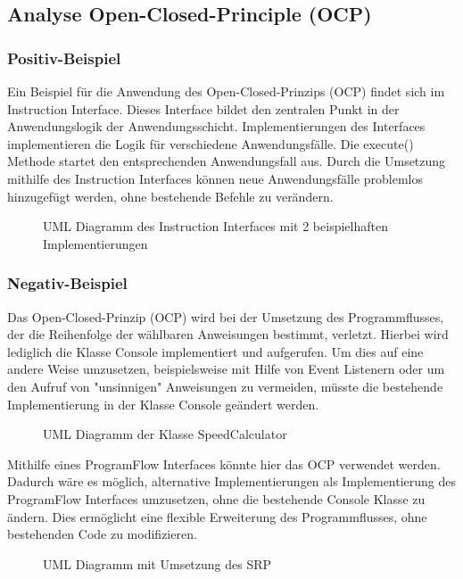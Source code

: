\subsection{Analyse Open-Closed-Principle (OCP)}

\subsubsection{Positiv-Beispiel}

Ein Beispiel für die Anwendung des Open-Closed-Prinzips (OCP) findet sich im Instruction Interface. Dieses Interface bildet den zentralen Punkt in der Anwendungslogik der Anwendungsschicht.
Implementierungen des Interfaces implementieren die Logik für verschiedene Anwendungsfälle.
Die execute() Methode startet den entsprechenden Anwendungsfall aus.
Durch die Umsetzung mithilfe des Instruction Interfaces können neue Anwendungsfälle problemlos hinzugefügt werden, ohne bestehende Befehle zu verändern.

\begin{figure}[H]
  \centering
  
  \caption{UML Diagramm des Instruction Interfaces mit 2 beispielhaften Implementierungen}
\end{figure}

\subsubsection{Negativ-Beispiel}

Das Open-Closed-Prinzip (OCP) wird bei der Umsetzung des Programmflusses, der die Reihenfolge der wählbaren Anweisungen bestimmt, verletzt. Hierbei wird lediglich die Klasse Console implementiert und aufgerufen. Um dies auf eine andere Weise umzusetzen, beispielsweise mit Hilfe von Event Listenern oder um den Aufruf von "unsinnigen" Anweisungen zu vermeiden, müsste die bestehende Implementierung in der Klasse Console geändert werden.

\begin{figure}[H]
  \centering
  
  \caption{UML Diagramm der Klasse SpeedCalculator}
\end{figure}

Mithilfe eines ProgramFlow Interfaces könnte hier das OCP verwendet werden.
Dadurch wäre es möglich, alternative Implementierungen als Implementierung des ProgramFlow Interfaces umzusetzen, ohne die bestehende Console Klasse zu ändern. Dies ermöglicht eine flexible Erweiterung des Programmflusses, ohne bestehenden Code zu modifizieren.
\begin{figure}[H]
  \centering
  
  \caption{UML Diagramm mit Umsetzung des SRP}
\end{figure}


